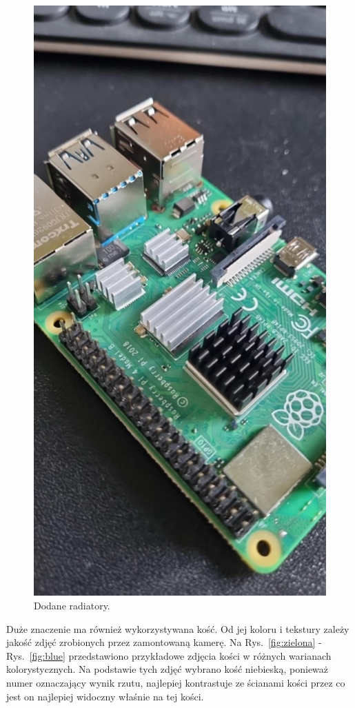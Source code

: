 \begin{figure}[H]
    \centering
    \includegraphics[width=0.25\linewidth, trim={0mm 50mm 0mm 120mm}, clip]{chapters/03-praca-wlasna/figures/now_we_are_cool}
    \caption{\label{fig:zimno}Dodane radiatory.}
\end{figure}

Duże znaczenie ma również wykorzystywana kość. Od jej koloru i tekstury zależy jakość zdjęć zrobionych przez
zamontowaną kamerę. Na Rys.~\ref{fig:zielona} - Rys.~\ref{fig:blue} przedstawiono przykładowe zdjęcia kości w różnych warianach kolorystycznych.
Na podstawie tych zdjęć wybrano kość niebieską, ponieważ numer oznaczający wynik rzutu, najlepiej kontrastuje ze ścianami kości przez co jest on najlepiej widoczny
właśnie na tej kości.


